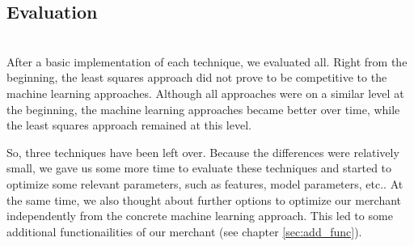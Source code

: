 \subsection{Evaluation}
	~\\
	After a basic implementation of each technique, we evaluated all. Right from the beginning, the least squares approach did not prove to be competitive to the machine learning approaches. Although all approaches were on a similar level at the beginning, the machine learning approaches became better over time, while the least squares approach remained at this level.

	So, three techniques have been left over. Because the differences were relatively small, we gave us some more time to evaluate these techniques and started to optimize some relevant parameters, such as features, model parameters, etc.. At the same time, we also thought about further options to optimize our merchant independently from the concrete machine learning approach. This led to some additional functionailities of our merchant (see chapter \ref{sec:add_func}).





